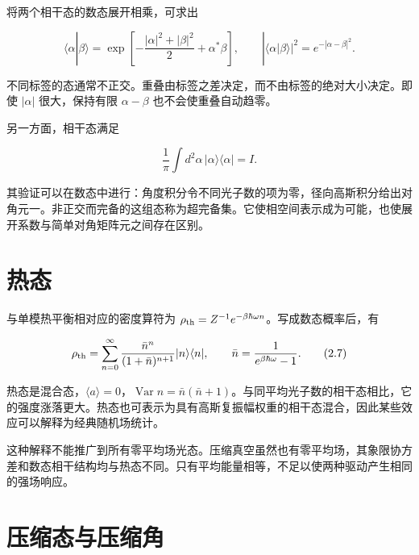 \documentclass[UTF8,a4paper,zihao=-4,openany,fontset=fandol]{ctexbook}
\begin{document}
将两个相干态的数态展开相乘，可求出



\begin{equation*}
\langle\alpha|\beta\rangle
=\exp\!\left[-\frac{|\alpha|^2+|\beta|^2}{2}+\alpha^*\beta\right],
\qquad |\langle\alpha|\beta\rangle|^2=e^{-|\alpha-\beta|^2}.
\tag{2.5}\label{eq:2.5}
\end{equation*}


不同标签的态通常不正交。重叠由标签之差决定，而不由标签的绝对大小决定。即使 $|\alpha|$ 很大，保持有限 $\alpha-\beta$ 也不会使重叠自动趋零。



另一方面，相干态满足



\begin{equation*}
\frac1\pi\int d^2\alpha\,|\alpha\rangle\langle\alpha|=I.
\tag{2.6}\label{eq:2.6}
\end{equation*}


其验证可以在数态中进行：角度积分令不同光子数的项为零，径向高斯积分给出对角元一。非正交而完备的这组态称为超完备集。它使相空间表示成为可能，也使展开系数与简单对角矩阵元之间存在区别。



\section{热态}\label{sec:02:5}


与单模热平衡相对应的密度算符为 $\rho_{\rm th}=Z^{-1}e^{-\beta\hbar\omega n}$。写成数态概率后，有



\begin{equation*}
\rho_{\rm th}=\sum_{n=0}^{\infty}
\frac{\bar n^n}{(1+\bar n)^{n+1}}|n\rangle\langle n|,
\qquad \bar n=\frac1{e^{\beta\hbar\omega}-1}.
\tag{2.7}\label{eq:2.7}
\end{equation*}


热态是混合态，$\langle a\rangle=0$，$\operatorname{Var}n=\bar n(\bar n+1)$。与同平均光子数的相干态相比，它的强度涨落更大。热态也可表示为具有高斯复振幅权重的相干态混合，因此某些效应可以解释为经典随机场统计。



这种解释不能推广到所有零平均场光态。压缩真空虽然也有零平均场，其象限协方差和数态相干结构均与热态不同。只有平均能量相等，不足以使两种驱动产生相同的强场响应。



\section{压缩态与压缩角}\label{sec:02:6}
\end{document}
